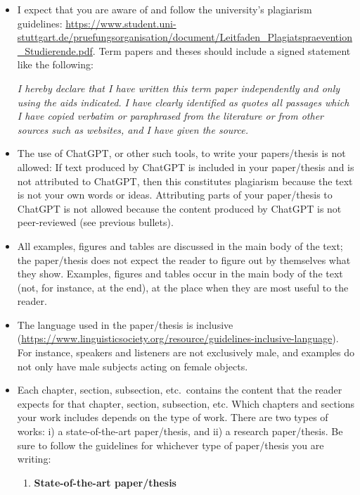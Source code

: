\documentclass[11pt,fleqn,a4paper/thesis]{article}
\newcommand{\6}{\mbox{$[\hspace*{-.6mm}[$}}
\newcommand{\9}{\mbox{$]\hspace*{-.6mm}]$}}
\begin{document}
\begin{itemize}[itemsep=-1pt,leftmargin=2.5ex,topsep=-2pt]
\item I expect that you are aware of and follow the university's plagiarism guidelines: \url{https://www.student.uni-stuttgart.de/pruefungsorganisation/document/Leitfaden_Plagiatspraevention_Studierende.pdf}. Term papers and theses should include a signed statement like the following:

{\em I hereby declare that I have written this term paper independently and only using the aids indicated. I have clearly identified as quotes all passages which I have copied verbatim or paraphrased from the literature or from other sources such as websites, and I have given the source.}

\item The use of ChatGPT, or other such tools, to write your papers/thesis is not allowed: If text produced by ChatGPT is included in your paper/thesis and is not attributed to ChatGPT,  then this constitutes plagiarism because the text is not your own words or ideas. Attributing parts of your paper/thesis to ChatGPT is not allowed because the content produced by ChatGPT is not peer-reviewed (see previous bullets).

\item All examples, figures and tables are discussed in the main body of the text; the paper/thesis does not expect the reader to figure out by themselves what they show. Examples, figures and tables occur in the main body of the text (not, for instance, at the end), at the place when they are most useful to the reader.

\item The language used in the paper/thesis is inclusive (\url{https://www.linguisticsociety.org/resource/guidelines-inclusive-language}). For instance, speakers and listeners are not exclusively male, and examples do not only have male subjects acting on female objects.

\item Each chapter, section, subsection, etc.\ contains the content that the reader expects for that chapter, section, subsection, etc. Which chapters and sections your work includes depends on the type of work.  There are two types of works: i) a state-of-the-art paper/thesis, and ii) a research paper/thesis. Be sure to follow the guidelines for whichever type of paper/thesis you are writing:

\begin{enumerate}

\item {\bf State-of-the-art paper/thesis}


\end{enumerate}
\end{itemize}
\end{document}
